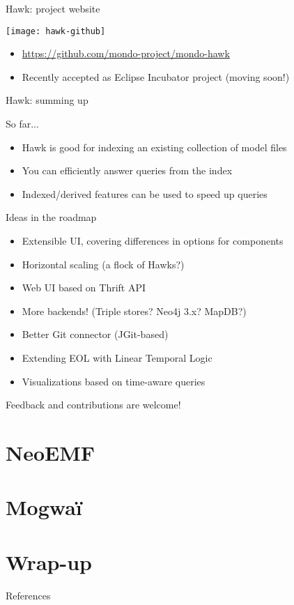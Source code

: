 \begin{frame}{Hawk: project website}
  \begin{center}
    \texttt{[image: hawk-github]}
  \end{center}

  \begin{itemize}
  \item \url{https://github.com/mondo-project/mondo-hawk}
  \item Recently accepted as Eclipse Incubator project (moving soon!)
  \end{itemize}
\end{frame}

\begin{frame}{Hawk: summing up}

  \begin{block}{So far...}
    \begin{itemize}
    \item Hawk is good for indexing an existing collection of model files
    \item You can efficiently answer queries from the index
    \item Indexed/derived features can be used to speed up queries
    \end{itemize}
  \end{block}

  \begin{block}{Ideas in the roadmap}
    \begin{itemize}
    \item Extensible UI, covering differences in options for components
    \item Horizontal scaling (a flock of Hawks?)
    \item Web UI based on Thrift API
    \item More backends! (Triple stores? Neo4j 3.x? MapDB?)
    \item Better Git connector (JGit-based)
    \item Extending EOL with Linear Temporal Logic
    \item Visualizations based on time-aware queries
    \end{itemize}

    Feedback and contributions are welcome!
  \end{block}

\end{frame}

\section{NeoEMF}

\section{Mogwa\"i}

\section{Wrap-up}

\begin{frame}[allowframebreaks]{References}

  
  

\end{frame}


